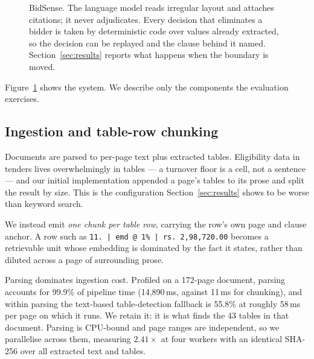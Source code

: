 \documentclass[conference]{IEEEtran}
\begin{document}
\begin{figure}[t]
\caption{BidSense. The language model reads irregular layout and attaches
citations; it never adjudicates. Every decision that eliminates a bidder is
taken by deterministic code over values already extracted, so the decision can
be replayed and the clause behind it named. Section~\ref{sec:results} reports
what happens when the boundary is moved.}
\label{fig:arch}
\end{figure}

Figure~\ref{fig:arch} shows the system. We describe only the components the
evaluation exercises.

\subsection{Ingestion and table-row chunking}

Documents are parsed to per-page text plus extracted tables. Eligibility data in
tenders lives overwhelmingly in tables --- a turnover floor is a cell, not a
sentence --- and our initial implementation appended a page's tables to its prose
and split the result by size. This is the configuration
Section~\ref{sec:results} shows to be worse than keyword search.

We instead emit \emph{one chunk per table row}, carrying the row's own page and
clause anchor. A row such as \texttt{11. | emd @ 1\% | rs. 2,98,720.00} becomes a
retrievable unit whose embedding is dominated by the fact it states, rather than
diluted across a page of surrounding prose.

Parsing dominates ingestion cost. Profiled on a 172-page document, parsing
accounts for 99.9\% of pipeline time (14{,}890\,ms, against 11\,ms for
chunking), and within parsing the text-based table-detection fallback is 55.8\%
at roughly 58\,ms per page on which it runs. We retain it: it is what finds the
43 tables in that document. Parsing is CPU-bound and page ranges are
independent, so we parallelise across them, measuring $2.41\times$ at four
workers with an identical SHA-256 over all extracted text and tables.
\end{document}
